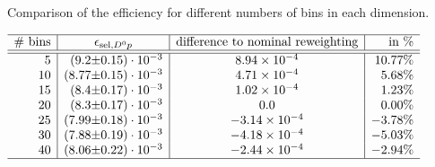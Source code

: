  
\begin{table}[hptb]
    \centering
    \caption{Comparison of the efficiency \effSelDp for different numbers of bins in each dimension.}
    \label{tab:systematic_effD0p_nbins}
    $\begin{array}{r|r@{\pm}l|c|r}
    \hline
    \text{\# bins}  & \multicolumn{2}{c|}{\effSelDp}  & \text{difference to nominal reweighting} & \text{in \%} \\ \hline \hline
5 & (9.2 & 0.15) \cdot 10^{-3} & \num[round-mode=figures, round-precision=3]{0.000893867513509} & 10.77\%\\ 10 & (8.77 & 0.15) \cdot 10^{-3} & \num[round-mode=figures, round-precision=3]{0.000471373232304} & 5.68\%\\ 15 & (8.4 & 0.17) \cdot 10^{-3} & \num[round-mode=figures, round-precision=3]{0.000101756679921} & 1.23\%\\ 20 & (8.3 & 0.17) \cdot 10^{-3} & \num[round-mode=figures, round-precision=3]{0.0} & 0.00\%\\ 25 & (7.99 & 0.18) \cdot 10^{-3} & \num[round-mode=figures, round-precision=3]{-0.000313870153072} & -3.78\%\\ 30 & (7.88 & 0.19) \cdot 10^{-3} & \num[round-mode=figures, round-precision=3]{-0.000418015648779} & -5.03\%\\ 40 & (8.06 & 0.22) \cdot 10^{-3} & \num[round-mode=figures, round-precision=3]{-0.000243686560501} & -2.94\%\\ 
    \hline
    \end{array}$
\end{table}

